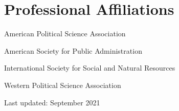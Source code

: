 \documentclass[11pt,letterpaper]{article}
\renewenvironment{itemize}{
  \begin{list}{}{
    \setlength{\leftmargin}{1.5em}
    \setlength{\itemsep}{0.25em}
    \setlength{\parskip}{0pt}
    \setlength{\parsep}{0.25em}
  }
}{
  \end{list}
}
\begin{document}
\section*{Professional Affiliations}
\begin{itemize}
	\item American Political Science Association
	\item American Society for Public Administration
	\item International Society for Social and Natural Resources
	\item Western Political Science Association
\end{itemize}


%		
%		
%			

	
\vspace{8in}
\begin{center}
  \begin{small}
    Last updated: September 2021
      \end{small}
\end{center}
\end{document}
